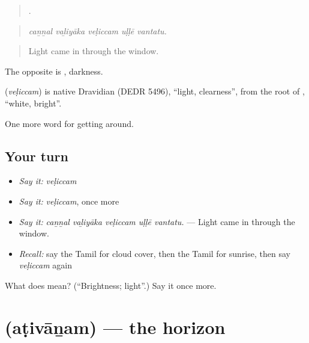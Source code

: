 \begin{quote}
    .
\end{quote}

\begin{quote}
\emph{caṉṉal vaḻiyāka veḷiccam uḷḷē vantatu.}
\end{quote}

\begin{quote}
Light came in through the window.
\end{quote}

The opposite is , darkness.

\begin{cousinweb}
\textbf{} (\emph{veḷiccam}) is native Dravidian (DEDR 5496), \textquotedblleft{}light, clearness\textquotedblright{}, from the root of , \textquotedblleft{}white, bright\textquotedblright{}.
\end{cousinweb}

\begin{grammarlens}[title={What you've built}]
One more word for getting around.
\end{grammarlens}

\subsection*{Your turn}
\begin{itemize}
\raggedright
  \item \emph{Say it:} \emph{veḷiccam}
  \item \emph{Say it:} \emph{veḷiccam}, once more
  \item \emph{Say it:} \emph{caṉṉal vaḻiyāka veḷiccam uḷḷē vantatu.} — Light came in through the window.
  \item \emph{Recall:} say the Tamil for cloud cover, then the Tamil for sunrise, then say \emph{veḷiccam} again
\end{itemize}

\begin{tcolorbox}[breakable,colback=teal!4,colframe=teal!35!black,title={Before you move on}]
What does  mean? (\textquotedblleft{}Brightness; light\textquotedblright{}.) Say it once more.
\end{tcolorbox}
\section[\texorpdfstring{\ta{அடிவானம்} (aṭivāṉam)}{அடிவானம் (aṭivāṉam)}]{ (aṭivāṉam) — the horizon}

